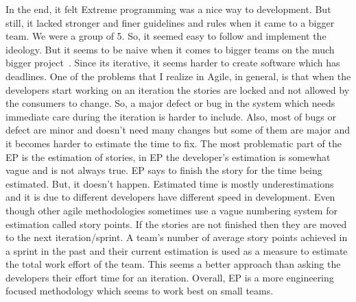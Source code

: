 In the end, it felt Extreme programming was a nice way to development. But still, it lacked stronger and finer guidelines and rules when it came to a bigger team. We were a group of 5. So, it seemed easy to follow and implement the ideology. But it seems to be naive when it comes to bigger teams on the much bigger project~\cite{muller2001case}. Since its iterative, it seems harder to create software which has deadlines. One of the problems that I realize in Agile, in general, is that when the developers start working on an iteration the stories are locked and not allowed by the consumers to change. So, a major defect or bug in the system which needs immediate care during the iteration is harder to include. Also, most of bugs or defect are minor and doesn't need many changes but some of them are major and it becomes harder to estimate the time to fix. The most problematic part of the EP is the estimation of stories, in EP the developer’s estimation is somewhat vague and is not always true. EP says to finish the story for the time being estimated. But, it doesn't happen. Estimated time is mostly underestimations and it is due to different developers have different speed in development. Even though other agile methodologies sometimes use a vague numbering system for estimation called story points. If the stories are not finished then they are moved to the next iteration/sprint. A team's number of average story points achieved in a sprint in the past and their current estimation is used as a measure to estimate the total work effort of the team. This seems a better approach than asking the developers their effort time for an iteration. Overall, EP is a more engineering focused methodology which seems to work best on small teams.
